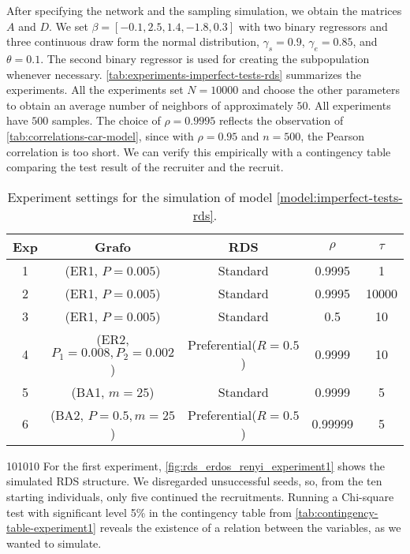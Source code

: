 After specifying the network and the sampling simulation, we obtain the
matrices $A$ and $D$. We set $\beta =
  [-0.1, 2.5, 1.4, -1.8, 0.3]
$ with two binary regressors and three continuous draw form the normal
distribution, $\gamma_s = 0.9$, $\gamma_e = 0.85$, and $\theta = 0.1$.
The second binary regressor is used for creating the subpopulation whenever
necessary. \autoref{tab:experiments-imperfect-tests-rds} summarizes the
experiments. All the experiments set $N=10000$ and choose the other parameters
to obtain an average number of neighbors of approximately $50$. All
experiments have $500$ samples. The choice of $\rho = 0.9995$ reflects the
observation of \autoref{tab:correlations-car-model}, since with $\rho = 0.95$
and $n=500$, the Pearson correlation is too short. We can verify this
empirically with a contingency table comparing the test result of the
recruiter and the recruit.

\begin{table}[htbp]
  \centering
  \caption{\label{tab:experiments-imperfect-tests-rds}Experiment settings for
    the simulation of model \eqref{model:imperfect-tests-rds}.}
  \begin{tabular}{ccccc}
    \hline
    Exp & Grafo                           & RDS                     & $\rho$ & $\tau$ \\ \hline
    1   & (ER1, $P=0.005$)                & Standard                & 0.9995  & 1      \\
    2   & (ER1, $P=0.005$)                & Standard                & 0.9995  & 10000  \\
    3   & (ER1, $P=0.005$)                & Standard                & 0.5    & 10      \\
    4   & (ER2, $P_1=0.008, P_2 = 0.002$) & Preferential($R = 0.5$) & 0.9999  & 10      \\
    5   & (BA1, $m = 25$)                 & Standard                & 0.9999  & 5      \\
    6   & (BA2, $P = 0.5, m = 25$)        & Preferential($R=0.5$)   & 0.99999  & 5      \\ \hline
  \end{tabular}
\end{table}
101010
For the first experiment, \autoref{fig:rds_erdos_renyi_experiment1}  shows the
simulated RDS structure. We disregarded unsuccessful seeds, so, from the ten
starting individuals, only five continued the recruitments. Running a
Chi-square test with significant level 5\% in the contingency
table from \autoref{tab:contingency-table-experiment1} reveals the existence
of a relation between the variables, as we wanted to simulate.

